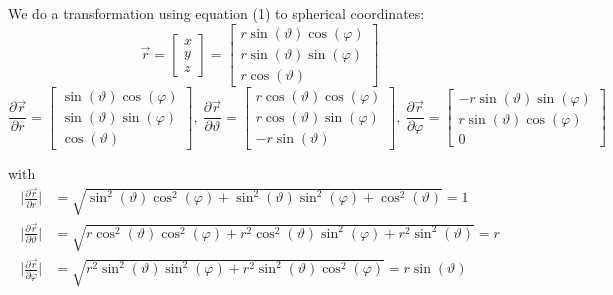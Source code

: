 \documentclass[11pt,a4paper]{article}
\begin{document}
\begin{enumerate}
We do a transformation using equation (1) to spherical coordinates:
\begin{equation*}
\vec{r}=
\begin{bmatrix}
x \\
y \\
z
\end{bmatrix}
=
\begin{bmatrix}
r\sin(\vartheta)\cos(\varphi) \\
r\sin(\vartheta)\sin(\varphi) \\
r\cos(\vartheta)
\end{bmatrix}
\end{equation*}
\begin{equation*}
\frac{\partial\vec{r}}{\partial r}
=
\begin{bmatrix}
\sin(\vartheta)\cos(\varphi) \\
\sin(\vartheta)\sin(\varphi) \\
\cos(\vartheta)
\end{bmatrix},\ 
\frac{\partial\vec{r}}{\partial \vartheta}
=
\begin{bmatrix}
r\cos(\vartheta)\cos(\varphi) \\
r\cos(\vartheta)\sin(\varphi) \\
-r\sin(\vartheta)
\end{bmatrix},\ 
\frac{\partial\vec{r}}{\partial \varphi}
=
\begin{bmatrix}
-r\sin(\vartheta)\sin(\varphi) \\
r\sin(\vartheta)\cos(\varphi) \\
0
\end{bmatrix}
\end{equation*}

with
\begin{align*}
\bigg|\frac{\partial\vec{r}}{\partial r}\bigg|&=\sqrt{\sin^2(\vartheta)\cos^2(\varphi)+\sin^2(\vartheta)\sin^2(\varphi)+\cos^2(\vartheta)}=1 \\
\bigg|\frac{\partial\vec{r}}{\partial \vartheta}\bigg|&=\sqrt{r\cos^2(\vartheta)\cos^2(\varphi)+r^2\cos^2(\vartheta)\sin^2(\varphi)+r^2\sin^2(\vartheta)}=r \\
\bigg|\frac{\partial\vec{r}}{\partial \varphi}\bigg|&=\sqrt{r^2\sin^2(\vartheta)\sin^2(\varphi)+r^2\sin^2(\vartheta)\cos^2(\varphi)}=r\sin(\vartheta)
\end{align*}


\end{enumerate}
\end{document}

